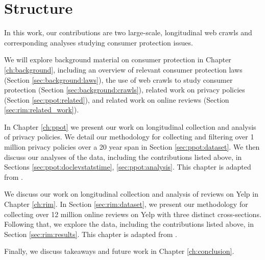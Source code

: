 \section{Structure}

In this work, our contributions are two large-scale, longitudinal web crawls and corresponding analyses studying consumer protection issues. 

We will explore background material on consumer protection in Chapter \ref{ch:background}, including an overview of relevant consumer protection laws (Section \ref{sec:background:laws}), the use of web crawls to study consumer protection (Section \ref{sec:background:crawls}), related work on privacy policies (Section \ref{sec:ppot:related}), and related work on online reviews (Section \ref{sec:rim:related_work}).

In Chapter \ref{ch:ppot} we present our work on longitudinal collection and analysis of privacy policies. We detail our methodology for collecting and filtering over 1 million privacy policies over a 20 year span in Section \ref{sec:ppot:dataset}. We then discuss our analyses of the data, including the contributions listed above, in Sections \ref{sec:ppot:doclevstatstime}, \ref{sec:ppot:analysis}. This chapter is adapted from \citet{amos2021privacy}.

We discuss our work on longitudinal collection and analysis of reviews on Yelp in Chapter \ref{ch:rim}. In Section \ref{sec:rim:dataset}, we present our methodology for collecting over 12 million online reviews on Yelp with three distinct cross-sections. Following that, we explore the data, including the contributions listed above, in Section \ref{sec:rim:results}. This chapter is adapted from \citet{amos2022reviews}.

Finally, we discuss takeaways and future work in Chapter \ref{ch:conclusion}. 